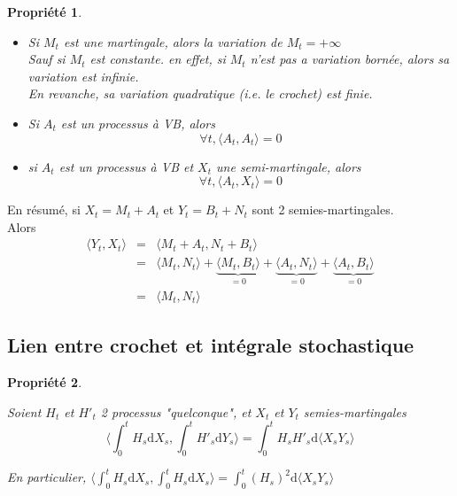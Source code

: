 \documentclass{report}
\newtheorem{prop}{Propri\'et\'e}
\newenvironment{encadre}{%
  \setlength{\theorempreskipamount}{0pt}%
  \setlength{\theorempostskipamount}{0pt}%
  \begin{framed}%
 }{%
  \vspace{-2pt}%
  \end{framed}%
 }
\begin{document}
\begin{encadre}
\begin{prop}$\ $
\begin{itemize}
    \item Si $M_t$ est une martingale, alors la variation de $M_t = +\infty$\\
    Sauf si $M_t$ est constante. en effet, si $M_t$ n'est pas a variation bornée, alors sa variation est infinie\footnotemark.\\
    En revanche, sa variation quadratique (\textit{i.e.} le crochet) est finie\footnotemark. 
    \item Si $A_t$ est un processus à VB, alors \[\forall t, \langle A_t, A_t\rangle = 0\]
    \item si $A_t$ est un processus à VB et $X_t$ une semi-martingale, alors \[\forall t, \langle A_t, X_t\rangle = 0\]
\end{itemize}
\end{prop}
\end{encadre}

En résumé, si $X_t = M_t+A_t$ et $Y_t=B_t+N_t$ sont 2 semies-martingales.\\Alors
\begin{eqnarray}
\langle Y_t, X_t\rangle &=& \langle M_t+A_t, N_t+B_t\rangle \nonumber \\
&=& \langle M_t,N_t\rangle + \underbrace{\langle M_t, B_t \rangle}_{=0}+ \underbrace{\langle A_t, N_t \rangle}_{=0}+ \underbrace{\langle A_t, B_t \rangle}_{=0} \nonumber\\
&=& \langle M_t,N_t\rangle \nonumber
\end{eqnarray}

\subsection{Lien entre crochet et intégrale stochastique}

\begin{encadre}
\begin{prop}$\ $

Soient $H_t$ et $H'_t$ 2 processus "quelconque", et $X_t$ et $Y_t$ semies-martingales \[\Bigg\langle\displaystyle\int^t_0H_s\mathrm{d}X_s,\displaystyle\int^t_0H'_s\mathrm{d}Y_s\Bigg\rangle=\displaystyle\int^t_0H_sH'_s\mathrm{d}\langle X_sY_s\rangle\]

\vspace{0.5cm}
En particulier, $\Bigg\langle\displaystyle\int^t_0H_s\mathrm{d}X_s,\displaystyle\int^t_0H_s\mathrm{d}X_s\Bigg\rangle=\displaystyle\int^t_0(H_s)^2\mathrm{d}\langle X_sY_s\rangle$

\end{prop}
\end{encadre}
\end{document}
